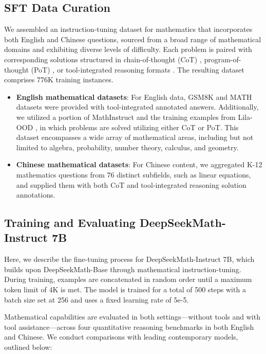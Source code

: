 \subsection{SFT Data Curation}

We assembled an instruction-tuning dataset for mathematics that incorporates both English and Chinese questions, sourced from a broad range of mathematical domains and exhibiting diverse levels of difficulty. Each problem is paired with corresponding solutions structured in chain-of-thought (CoT) \citep{cot}, program-of-thought (PoT) \citep{pot,pal}, or tool-integrated reasoning formats \citep{tora}. The resulting dataset comprises 776K training instances.

\begin{itemize}[topsep=0pt]
    \item \textbf{English mathematical datasets}: For English data, GSM8K and MATH datasets were provided with tool-integrated annotated answers. Additionally, we utilized a portion of MathInstruct \citep{MathInstruct} and the training examples from Lila-OOD \citep{lila}, in which problems are solved utilizing either CoT or PoT. This dataset encompasses a wide array of mathematical areas, including but not limited to algebra, probability, number theory, calculus, and geometry.
    \item \textbf{Chinese mathematical datasets}: For Chinese content, we aggregated K-12 mathematics questions from 76 distinct subfields, such as linear equations, and supplied them with both CoT and tool-integrated reasoning solution annotations.
\end{itemize}

\subsection{Training and Evaluating DeepSeekMath-Instruct 7B}

Here, we describe the fine-tuning process for DeepSeekMath-Instruct 7B, which builds upon DeepSeekMath-Base through mathematical instruction-tuning. During training, examples are concatenated in random order until a maximum token limit of 4K is met. The model is trained for a total of 500 steps with a batch size set at 256 and uses a fixed learning rate of 5e-5.

Mathematical capabilities are evaluated in both settings—without tools and with tool assistance—across four quantitative reasoning benchmarks in both English and Chinese. We conduct comparisons with leading contemporary models, outlined below:

